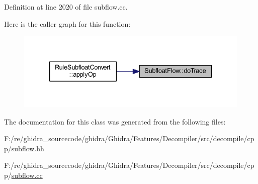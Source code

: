Definition at line 2020 of file subflow.\+cc.

Here is the caller graph for this function\+:
\nopagebreak
\begin{figure}[H]
\begin{center}
\leavevmode
\includegraphics[width=333pt]{class_subfloat_flow_a3dcd19f6211a8050c6a24759b1c90bd5_icgraph}
\end{center}
\end{figure}


The documentation for this class was generated from the following files\+:\begin{DoxyCompactItemize}
\item 
F\+:/re/ghidra\+\_\+sourcecode/ghidra/\+Ghidra/\+Features/\+Decompiler/src/decompile/cpp/\mbox{\hyperlink{subflow_8hh}{subflow.\+hh}}\item 
F\+:/re/ghidra\+\_\+sourcecode/ghidra/\+Ghidra/\+Features/\+Decompiler/src/decompile/cpp/\mbox{\hyperlink{subflow_8cc}{subflow.\+cc}}\end{DoxyCompactItemize}
